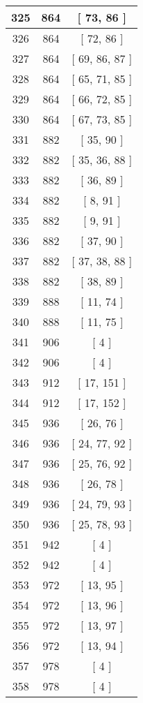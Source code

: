 \begin{center}
\begin{longtable}[H]{|| c c c ||}
\hline
325 & 864 & [ 73, 86 ] \\ 
\hline
326 & 864 & [ 72, 86 ] \\ 
\hline
327 & 864 & [ 69, 86, 87 ] \\ 
\hline
328 & 864 & [ 65, 71, 85 ] \\ 
\hline
329 & 864 & [ 66, 72, 85 ] \\ 
\hline
330 & 864 & [ 67, 73, 85 ] \\ 
\hline
331 & 882 & [ 35, 90 ] \\ 
\hline
332 & 882 & [ 35, 36, 88 ] \\ 
\hline
333 & 882 & [ 36, 89 ] \\ 
\hline
334 & 882 & [ 8, 91 ] \\ 
\hline
335 & 882 & [ 9, 91 ] \\ 
\hline
336 & 882 & [ 37, 90 ] \\ 
\hline
337 & 882 & [ 37, 38, 88 ] \\ 
\hline
338 & 882 & [ 38, 89 ] \\ 
\hline
339 & 888 & [ 11, 74 ] \\ 
\hline
340 & 888 & [ 11, 75 ] \\ 
\hline
341 & 906 & [ 4 ] \\ 
\hline
342 & 906 & [ 4 ] \\ 
\hline
343 & 912 & [ 17, 151 ] \\ 
\hline
344 & 912 & [ 17, 152 ] \\ 
\hline
345 & 936 & [ 26, 76 ] \\ 
\hline
346 & 936 & [ 24, 77, 92 ] \\ 
\hline
347 & 936 & [ 25, 76, 92 ] \\ 
\hline
348 & 936 & [ 26, 78 ] \\ 
\hline
349 & 936 & [ 24, 79, 93 ] \\ 
\hline
350 & 936 & [ 25, 78, 93 ] \\ 
\hline
351 & 942 & [ 4 ] \\ 
\hline
352 & 942 & [ 4 ] \\ 
\hline
353 & 972 & [ 13, 95 ] \\ 
\hline
354 & 972 & [ 13, 96 ] \\ 
\hline
355 & 972 & [ 13, 97 ] \\ 
\hline
356 & 972 & [ 13, 94 ] \\ 
\hline
357 & 978 & [ 4 ] \\ 
\hline
358 & 978 & [ 4 ] \\ 
\hline
\end{longtable}
\end{center}

